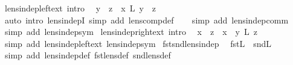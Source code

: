 \begin{isabellebody}
%
\endisatagproof
{\isafoldproof}%
%
\isadelimproof
\isanewline
%
\endisadelimproof
\isanewline
{}\isamarkupfalse%
\ lens{\isacharunderscore}indep{\isacharunderscore}left{\isacharunderscore}ext\ {\isacharbrackleft}intro{\isacharbrackright}{\isacharcolon}\isanewline
\ \ {\isachardoublequoteopen}y\ {\isasymbowtie}\ z\ {\isasymLongrightarrow}\ {\isacharparenleft}x\ {\isacharsemicolon}\isactrlsub L\ y{\isacharparenright}\ {\isasymbowtie}\ z{\isachardoublequoteclose}\isanewline
%
\isadelimproof
\ \ %
\endisadelimproof
%
\isatagproof
{}\isamarkupfalse%
\ {\isacharparenleft}auto\ intro{\isacharbang}{\isacharcolon}\ lens{\isacharunderscore}indepI\ simp\ add{\isacharcolon}\ lens{\isacharunderscore}comp{\isacharunderscore}def{\isacharparenright}\isanewline
\ \ \isamarkupfalse%
\ {\isacharparenleft}simp\ add{\isacharcolon}\ lens{\isacharunderscore}indep{\isacharunderscore}comm{\isacharparenright}\isanewline
\ \ \isamarkupfalse%
\ {\isacharparenleft}simp\ add{\isacharcolon}\ lens{\isacharunderscore}indep{\isacharunderscore}sym{\isacharparenright}\isanewline
{}\isamarkupfalse%
%
\endisatagproof
{\isafoldproof}%
%
\isadelimproof
\isanewline
%
\endisadelimproof
\isanewline
{}\isamarkupfalse%
\ lens{\isacharunderscore}indep{\isacharunderscore}right{\isacharunderscore}ext\ {\isacharbrackleft}intro{\isacharbrackright}{\isacharcolon}\isanewline
\ \ {\isachardoublequoteopen}x\ {\isasymbowtie}\ z\ {\isasymLongrightarrow}\ x\ {\isasymbowtie}\ {\isacharparenleft}y\ {\isacharsemicolon}\isactrlsub L\ z{\isacharparenright}{\isachardoublequoteclose}\isanewline
%
\isadelimproof
\ \ %
\endisadelimproof
%
\isatagproof
{}\isamarkupfalse%
\ {\isacharparenleft}simp\ add{\isacharcolon}\ lens{\isacharunderscore}indep{\isacharunderscore}left{\isacharunderscore}ext\ lens{\isacharunderscore}indep{\isacharunderscore}sym{\isacharparenright}%
\endisatagproof
{\isafoldproof}%
%
\isadelimproof
\isanewline
%
\endisadelimproof
\isanewline
{}\isamarkupfalse%
\ fst{\isacharunderscore}snd{\isacharunderscore}lens{\isacharunderscore}indep{\isacharcolon}\isanewline
\ \ {\isachardoublequoteopen}fst\isactrlsub L\ {\isasymbowtie}\ snd\isactrlsub L{\isachardoublequoteclose}\isanewline
%
\isadelimproof
\ \ %
\endisadelimproof
%
\isatagproof
{}\isamarkupfalse%
\ {\isacharparenleft}simp\ add{\isacharcolon}\ lens{\isacharunderscore}indep{\isacharunderscore}def\ fst{\isacharunderscore}lens{\isacharunderscore}def\ snd{\isacharunderscore}lens{\isacharunderscore}def{\isacharparenright}%

\end{isabellebody}
